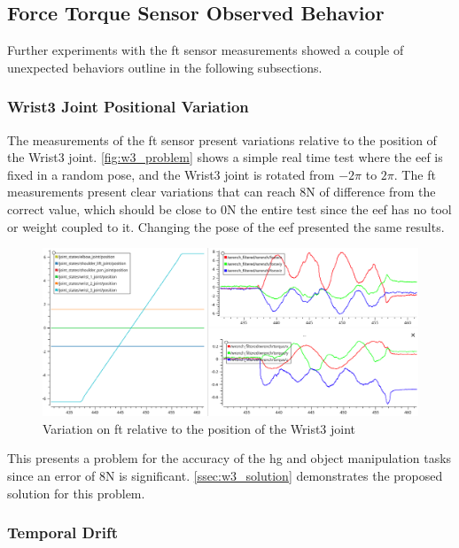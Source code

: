 \subsection{Force Torque Sensor Observed Behavior}

\par Further experiments with the \ac{ft} sensor measurements showed a couple of unexpected behaviors outline in the following subsections.

\subsubsection{Wrist3 Joint Positional Variation}

\par The measurements of the \ac{ft} sensor present variations relative to the position of the Wrist3 joint. \autoref{fig:w3_problem} shows a simple real time test where the \ac{eef} is fixed in a random pose, and the Wrist3 joint is rotated from $-2\pi$ to $2\pi$. The \ac{ft} measurements present clear variations that can reach 8N of difference from the correct value, which should be close to 0N the entire test since the \ac{eef} has no tool or weight coupled to it. Changing the pose of the \ac{eef} presented the same results. 

\begin{figure}[h]
    \centering
    \includegraphics[width=0.9\linewidth]{figs/chp3/wrist_3_problem.png}
    \caption{Variation on \ac{ft} relative to the position of the Wrist3 joint}
    \label{fig:w3_problem}
\end{figure}

\par This presents a problem for the accuracy of the \ac{hg} and object manipulation tasks since an error of 8N is significant. \autoref{ssec:w3_solution} demonstrates the proposed solution for this problem.

\subsubsection{Temporal Drift}

